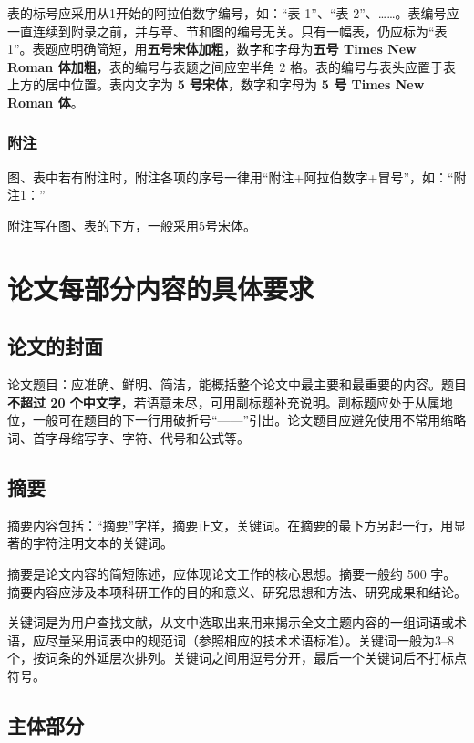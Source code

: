 \documentclass{buaa_fengru}
\begin{document}
表的标号应采用从1开始的阿拉伯数字编号，如：“表 1”、“表 2”、……。表编号应一直连续到附录之前，并与章、节和图的编号无关。只有一幅表，仍应标为“表 1”。表题应明确简短，用\textbf{五号宋体加粗}，数字和字母为\textbf{五号 Times New Roman 体加粗}，表的编号与表题之间应空半角 2 格。表的编号与表头应置于表上方的居中位置。表内文字为 \textbf{5 号宋体}，数字和字母为 \textbf{5 号 Times New Roman 体}。  

\subsubsection{附注}

图、表中若有附注时，附注各项的序号一律用“附注+阿拉伯数字+冒号”，如：“附注1：”

附注写在图、表的下方，一般采用5号宋体。

\section{论文每部分内容的具体要求}

\subsection{论文的封面}

论文题目：应准确、鲜明、简洁，能概括整个论文中最主要和最重要的内容。题目\textbf{不超过 20 个中文字}，若语意未尽，可用副标题补充说明。副标题应处于从属地位，一般可在题目的下一行用破折号“——”引出。论文题目应避免使用不常用缩略词、首字母缩写字、字符、代号和公式等。

\subsection{摘要}

摘要内容包括：“摘要”字样，摘要正文，关键词。在摘要的最下方另起一行，用显著的字符注明文本的关键词。

摘要是论文内容的简短陈述，应体现论文工作的核心思想。摘要一般约 500 字。摘要内容应涉及本项科研工作的目的和意义、研究思想和方法、研究成果和结论。

关键词是为用户查找文献，从文中选取出来用来揭示全文主题内容的一组词语或术语，应尽量采用词表中的规范词（参照相应的技术术语标准）。关键词一般为3--8个，按词条的外延层次排列。关键词之间用逗号分开，最后一个关键词后不打标点符号。

\subsection{主体部分}
\end{document}
